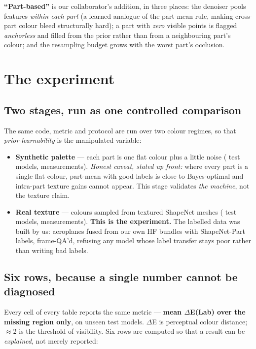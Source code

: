 \documentclass[11pt]{article}
\begin{document}
\textbf{``Part-based''} is our collaborator's addition, in three places: the denoiser pools
features \emph{within each part} (a learned analogue of the part-mean rule, making cross-part
colour bleed structurally hard); a part with \emph{zero} visible points is flagged
\emph{anchorless} and filled from the prior rather than from a neighbouring part's colour;
and the resampling budget grows with the worst part's occlusion.

\section{The experiment}\label{sec:exp}

\subsection{Two stages, run as one controlled comparison}

The same code, metric and protocol are run over two colour regimes, so that
\emph{prior-learnability} is the manipulated variable:

\begin{itemize}
  \item \textbf{Synthetic palette} --- each part is one flat colour plus a little noise
  (\nmodS{} test models, \nrowsS{} measurements). \emph{Honest caveat, stated up front:} where
  every part is a single flat colour, part-mean with good labels is close to Bayes-optimal and
  intra-part texture gains cannot appear. This stage validates \emph{the machine}, not the
  texture claim.
  \item \textbf{Real texture} --- colours sampled from textured ShapeNet meshes
  (\nmodR{} test models, \nrowsR{} measurements). \textbf{This is the experiment.} The labelled
  data was built by us: \nLabeled{} aeroplanes fused from our own HF bundles with
  ShapeNet-Part labels, frame-QA'd, refusing any model whose label transfer stays poor rather
  than writing bad labels.
\end{itemize}

\subsection{Six rows, because a single number cannot be diagnosed}

Every cell of every table reports the same metric --- \textbf{mean $\Delta$E(Lab) over the
missing region only}, on unseen test models. $\Delta$E is perceptual colour distance;
$\approx$2 is the threshold of visibility. Six rows are computed so that a result can be
\emph{explained}, not merely reported:
\end{document}
